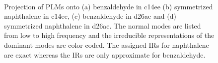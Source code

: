 \begin{figure}[ht]
 \\
\caption{Projection of PLMs onto (a) benzaldehyde in c14ee (b) symmetrized naphthalene in c14ee, (c) benzaldehyde in d26ae and (d) symmetrized naphthalene in d26ae.
The normal modes are listed from low to high frequency and the irreducible representations of the dominant modes are color-coded. The assigned IRs for naphthalene are exact
 whereas the IRs are only approximate for benzaldehyde. \label{fragProj}}
\end{figure}


